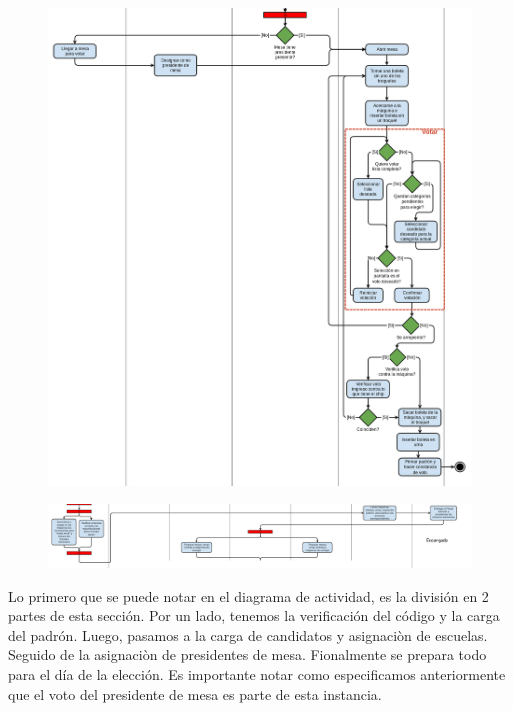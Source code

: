 \newpage

\begin{figure}[h!]
\centering
\includegraphics[scale=0.5]{imagenes/actividad/actividadPreparacion2}
\end{figure}

\begin{figure}[h!]
\centering
\includegraphics[scale=0.45]{imagenes/actividad/actividadPreparacion3}
\end{figure}

\newpage

Lo primero que se puede notar en el diagrama de actividad, es la división en 2 partes de esta sección. Por un lado, tenemos la verificación del código y la carga del padrón. Luego, pasamos a la carga de candidatos y asignaciòn de escuelas. Seguido de la asignaciòn de presidentes de mesa. Fionalmente se prepara todo para el día de la elección. Es importante notar como especificamos anteriormente que el voto del presidente de mesa es parte de esta instancia. 


